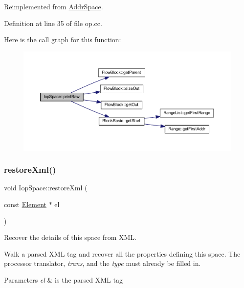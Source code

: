 Reimplemented from \mbox{\hyperlink{class_addr_space_a76819b70cd6b6ae8601ac1821f86b929}{Addr\+Space}}.



Definition at line 35 of file op.\+cc.

Here is the call graph for this function\+:
\nopagebreak
\begin{figure}[H]
\begin{center}
\leavevmode
\includegraphics[width=350pt]{class_iop_space_aa5e2fc99ee39d375ef563cd3fea2101d_cgraph}
\end{center}
\end{figure}
\mbox{\label{class_iop_space_a7c530a1e977334d59d2ebbc33147bcd9}} 
\subsubsection{\texorpdfstring{restoreXml()}{restoreXml()}}
{\footnotesize\ttfamily void Iop\+Space\+::restore\+Xml (\begin{DoxyParamCaption}\item[{const \mbox{\hyperlink{class_element}{Element}} $\ast$}]{el }\end{DoxyParamCaption})\hspace{0.3cm}{\ttfamily [virtual]}}



Recover the details of this space from X\+ML. 

Walk a parsed X\+ML tag and recover all the properties defining this space. The processor translator, {\itshape trans}, and the {\itshape type} must already be filled in. 
\begin{DoxyParams}{Parameters}
{\em el} & is the parsed X\+ML tag \\
\hline
\end{DoxyParams}


